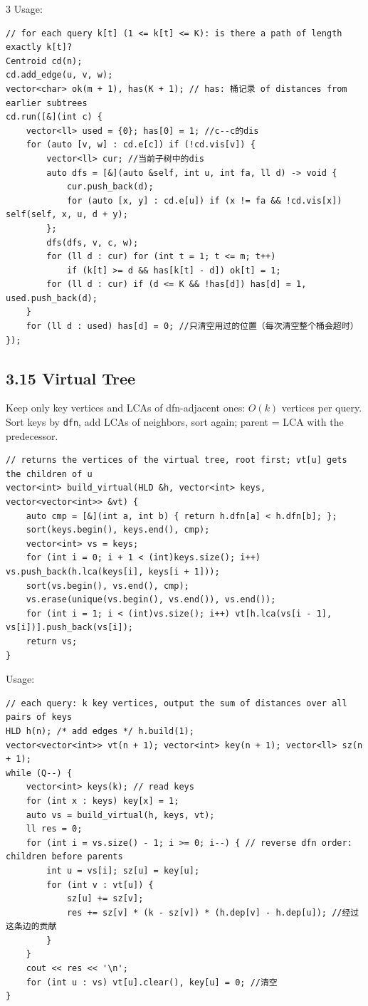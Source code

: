 \documentclass[8pt]{extarticle}
\begin{document}
\begin{multicols*}{3}
Usage:

\begin{lstlisting}
// for each query k[t] (1 <= k[t] <= K): is there a path of length exactly k[t]?
Centroid cd(n);
cd.add_edge(u, v, w);
vector<char> ok(m + 1), has(K + 1); // has: 桶记录 of distances from earlier subtrees
cd.run([&](int c) {
    vector<ll> used = {0}; has[0] = 1; //c--c的dis
    for (auto [v, w] : cd.e[c]) if (!cd.vis[v]) {
        vector<ll> cur; //当前子树中的dis
        auto dfs = [&](auto &self, int u, int fa, ll d) -> void {
            cur.push_back(d);
            for (auto [x, y] : cd.e[u]) if (x != fa && !cd.vis[x]) self(self, x, u, d + y);
        };
        dfs(dfs, v, c, w);
        for (ll d : cur) for (int t = 1; t <= m; t++)
            if (k[t] >= d && has[k[t] - d]) ok[t] = 1;
        for (ll d : cur) if (d <= K && !has[d]) has[d] = 1, used.push_back(d);
    }
    for (ll d : used) has[d] = 0; //只清空用过的位置（每次清空整个桶会超时）
});
\end{lstlisting}

\subsection*{3.15 Virtual Tree}

Keep only key vertices and LCAs of dfn-adjacent ones: $O(k)$ vertices per query. Sort keys by \texttt{dfn}, add LCAs of neighbors, sort again; parent = LCA with the predecessor.

\begin{lstlisting}
// returns the vertices of the virtual tree, root first; vt[u] gets the children of u
vector<int> build_virtual(HLD &h, vector<int> keys, vector<vector<int>> &vt) {
    auto cmp = [&](int a, int b) { return h.dfn[a] < h.dfn[b]; };
    sort(keys.begin(), keys.end(), cmp);
    vector<int> vs = keys;
    for (int i = 0; i + 1 < (int)keys.size(); i++) vs.push_back(h.lca(keys[i], keys[i + 1]));
    sort(vs.begin(), vs.end(), cmp);
    vs.erase(unique(vs.begin(), vs.end()), vs.end());
    for (int i = 1; i < (int)vs.size(); i++) vt[h.lca(vs[i - 1], vs[i])].push_back(vs[i]);
    return vs;
}
\end{lstlisting}

Usage:

\begin{lstlisting}
// each query: k key vertices, output the sum of distances over all pairs of keys
HLD h(n); /* add edges */ h.build(1);
vector<vector<int>> vt(n + 1); vector<int> key(n + 1); vector<ll> sz(n + 1);
while (Q--) {
    vector<int> keys(k); // read keys
    for (int x : keys) key[x] = 1;
    auto vs = build_virtual(h, keys, vt);
    ll res = 0;
    for (int i = vs.size() - 1; i >= 0; i--) { // reverse dfn order: children before parents
        int u = vs[i]; sz[u] = key[u];
        for (int v : vt[u]) {
            sz[u] += sz[v];
            res += sz[v] * (k - sz[v]) * (h.dep[v] - h.dep[u]); //经过这条边的贡献
        }
    }
    cout << res << '\n';
    for (int u : vs) vt[u].clear(), key[u] = 0; //清空
}
\end{lstlisting}


\end{multicols*}
\end{document}
